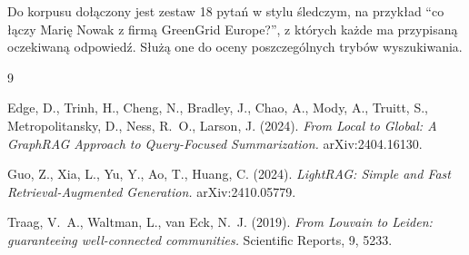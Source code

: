\documentclass[11pt,a4paper]{article}
\begin{document}
Do korpusu dołączony jest zestaw 18 pytań w stylu śledczym, na przykład \enquote{co łączy
Marię Nowak z firmą GreenGrid Europe?}, z których każde ma przypisaną oczekiwaną odpowiedź.
Służą one do oceny poszczególnych trybów wyszukiwania. 

\begin{thebibliography}{9}

Edge, D., Trinh, H., Cheng, N., Bradley, J., Chao, A., Mody, A., Truitt, S.,
Metropolitansky, D., Ness, R.~O., Larson, J. (2024).
\textit{From Local to Global: A GraphRAG Approach to Query-Focused Summarization.}
arXiv:2404.16130.

Guo, Z., Xia, L., Yu, Y., Ao, T., Huang, C. (2024).
\textit{LightRAG: Simple and Fast Retrieval-Augmented Generation.}
arXiv:2410.05779.

Traag, V.~A., Waltman, L., van Eck, N.~J. (2019).
\textit{From Louvain to Leiden: guaranteeing well-connected communities.}
Scientific Reports, 9, 5233.

\end{thebibliography}
\end{document}
